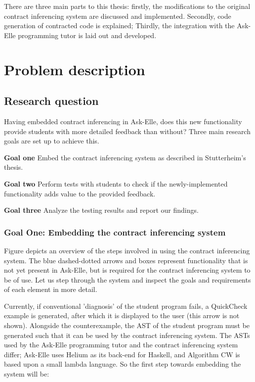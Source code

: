 \documentclass[10pt,a4paper]{article}
\begin{document}
There are three main parts to this thesis:
firstly, the modifications to the original contract inferencing system are discussed and implemented. Secondly, code generation of contracted code is explained; Thirdly, the integration with the Ask-Elle programming tutor is laid out and developed.

\section{Problem description}
\subsection{Research question}
Having embedded contract inferencing in Ask-Elle, does this new functionality provide students with more detailed feedback than without?
Three main research goals are set up to achieve this.

\begin{description}
	\item{\textbf{Goal one}} Embed the contract inferencing system as described in Stutterheim's thesis.
	\item{\textbf{Goal two}} Perform tests with students to check if the newly-implemented functionality adds value to the provided feedback.
	\item{\textbf{Goal three}} Analyze the testing results and report our findings.
\end{description}

\subsubsection{Goal One: Embedding the contract inferencing system}


Figure depicts an overview of the steps involved in using the contract inferencing system.
The blue dashed-dotted arrows and boxes represent functionality that is not yet present in Ask-Elle, but is required for the contract inferencing system to be of use.
Let us step through the system and inspect the goals and requirements of each element in more detail.

Currently, if conventional 'diagnosis' of the student program fails, a QuickCheck example is generated, after which it is displayed to the user (this arrow is not shown).
Alongside the counterexample, the AST of the student program must be generated such that it can be used by the contract inferencing system.
The ASTs used by the Ask-Elle programming tutor and the contract inferencing system differ; Ask-Elle uses Helium as its back-end for Haskell, and Algorithm CW is based upon a small lambda language. So the first step towards embedding the system will be:
\end{document}

